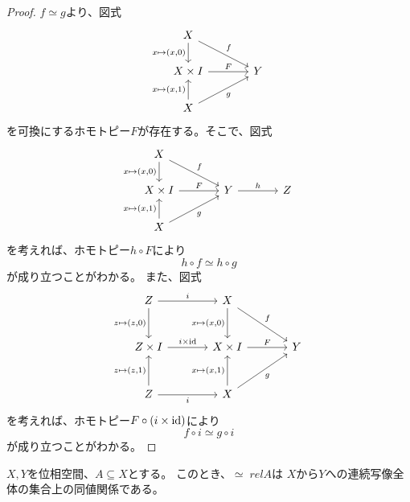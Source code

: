 \documentclass[report]{jlreq}
\begin{document}
\begin{proof}
    $f \simeq g$より、図式
    \begin{equation}
        \begin{tikzcd}[column sep=large]
            X \ar{d}[swap]{x \mapsto (x, 0)} \ar{dr}{f} \\
            X \times I \ar{r}{F} & Y \\
            X \ar{u}{x \mapsto (x, 1)} \ar{ur}[swap]{g}
        \end{tikzcd}
    \end{equation}
    を可換にするホモトピー$F$が存在する。そこで、図式
    \begin{equation}
        \begin{tikzcd}[column sep=large]
            X \ar{d}[swap]{x \mapsto (x, 0)} \ar{dr}{f} \\
            X \times I \ar{r}{F} & Y \ar{r}{h} & Z \\
            X \ar{u}{x \mapsto (x, 1)} \ar{ur}[swap]{g}
        \end{tikzcd}
    \end{equation}
    を考えれば、ホモトピー$h \circ F$により
    \begin{equation}
        h \circ f \simeq h \circ g
    \end{equation}
    が成り立つことがわかる。
    また、図式
    \begin{equation}
        \begin{tikzcd}[column sep=large, row sep=large]
            Z \ar{r}{i} \ar{d}[swap]{z \mapsto (z, 0)}
                & X \ar{d}[swap]{x \mapsto (x, 0)} \ar{dr}{f} \\
            Z \times I \ar{r}{i \times \id}
                & X \times I \ar{r}{F} & Y \\
            Z \ar{r}[swap]{i} \ar{u}{z \mapsto (z, 1)}
                & X \ar{u}{x \mapsto (x, 1)} \ar{ur}[swap]{g}
        \end{tikzcd}
    \end{equation}
    を考えれば、ホモトピー$F \circ (i \times \mathrm{id})$により
    \begin{equation}
        f \circ i \simeq g \circ i
    \end{equation}
    が成り立つことがわかる。
\end{proof}

\begin{lemma}
    $X, Y$を位相空間、$A \subseteq X$とする。
    このとき、$\simeq \; rel A$は
    $X$から$Y$への連続写像全体の集合上の同値関係である。
\end{lemma}
\end{document}
